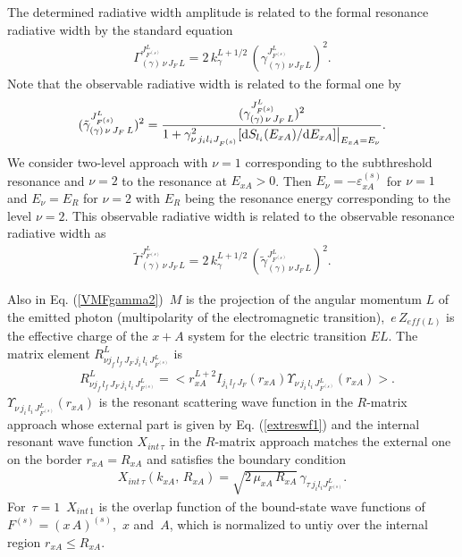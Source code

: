 \documentclass[prl,unsortedaddress,groupedaddress,twocolumn,amsmath,amsfonts,amssymb,showpacs,floatfix,nofootinbib]{revtex4}
\begin{document}
 The determined  radiative width amplitude is related to the formal resonance radiative width by the standard equation
\begin{align}
\Gamma_{(\gamma)\,\nu\,J_{F}\,L}^{J_{F^{(s)}}^{L}}= 2\,k_{\gamma}^{L+1/2}\,(\gamma_{(\gamma)\,\nu\,J_{F}\,L}^{J_{F^{(s)}}^{L}})^{2}.
\label{Gg1}
\end{align}
Note that the observable radiative width is related to the formal one by
\begin{align}
({\tilde \gamma}_{(\gamma)\,\nu\,J_{F}\,L}^{J_{F^{(s)}}^{L}})^{2} = \frac{(\gamma_{(\gamma)\,\nu\,J_{F}\,L}^{J_{F^{(s)}}^{L}})^{2}}{ 1+ \gamma_{\nu\,j_{i}l_{i}J_{F^{(s)}}}^{2} [{\rm d}S_{l_{i}}(E_{xA})/{\rm d}E_{xA}] \big|_{E_{xA}= E_{\nu}}}.
\label{observformradwidth1}
\end{align}
We consider two-level approach with $\nu=1$ corresponding to the subthreshold resonance and $\nu=2$
to the resonance at $E_{xA}>0$. Then $E_{\nu}=-\varepsilon_{xA}^{(s)}$ for $\nu=1$  and  $E_{\nu}= E_{R}$ for $\nu=2$ with $E_{R}$ being the resonance energy corresponding to the level
$\nu=2$.
This observable radiative width is related to the observable resonance radiative width as
\begin{align}
{\tilde \Gamma}_{(\gamma)\,\nu\,J_{F}\,L}^{J_{F^{(s)}}^{L}}= 2\,k_{\gamma}^{L+1/2}\,({\tilde \gamma}_{(\gamma)\,\nu\,J_{F}\,L}^{J_{F^{(s)}}^{L}})^{2}.
\label{Gg2}
\end{align}

Also in Eq. (\ref{VMFgamma2})  $\,M$  is  the projection  of the angular momentum $L$ of the emitted photon (multipolarity of the electromagnetic transition),  $\,e\,Z_{eff(L)}$ is the effective charge of the $x+A$ system for the electric transition $EL$. The matrix element  $R_{\nu j_{f}\,l_{f}\,J_{F}\,j_{i}\,l_{i}\,J_{F^{(s)}}^{L}}^{L} $ is
\begin{align}
&R_{\nu j_{f}\,l_{f}\,J_{F}\,j_{i}\,l_{i}\,J_{F^{(s)}}^{L}}^{L} = <r_{xA}^{L+2}  I_{j_{i}\,l_{f}\,J_{F}}(r_{xA}) \Upsilon_{\nu\,j_{i}\,l_{i}\,J_{F^{(s)}}^{L}}(r_{xA})>.
\label{matrelem1}
\end{align}
$\Upsilon_{\nu\,j_{i}\,l_{i}\,J_{F^{(s)}}^{L}}(r_{xA})$ is the resonant scattering wave function in the $R$-matrix approach  whose  external part is given by Eq. (\ref{extreswf1}) and the internal
resonant wave function $X_{int\,\tau}$ in the $R$-matrix approach matches the external one on the border $r_{xA}=R_{xA}$ and satisfies the boundary condition
\begin{align}
X_{int\,\tau}(k_{xA},\,R_{xA})=  \sqrt{2\,\mu_{xA}\,R_{xA}}\,\gamma_{\tau\,j_{i}l_{i}J_{F^{(s)}}^{L}}.
\label{Xintext1}
\end{align}
 For $\,\tau=1$ $\,X_{int\,1}$ is the overlap function of the bound-state wave functions of $F^{(s)}=(x\,A)^{(s)}$, $\,x$  and $\,A$, which is normalized to untiy over the internal region $r_{xA} \leq R_{xA}$.
\end{document}
